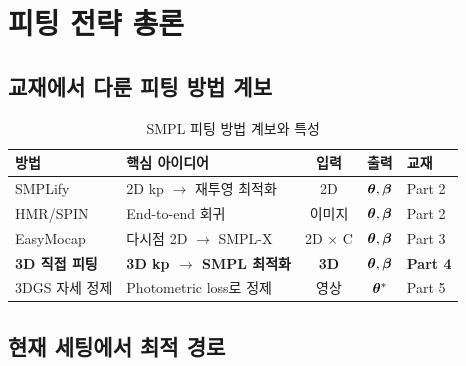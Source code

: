 \documentclass[11pt, a4paper]{report}
\begin{document}
\tableofcontents
\newpage


\chapter{피팅 전략 총론}

\section{교재에서 다룬 피팅 방법 계보}

\begin{table}[H]
\centering
\caption{SMPL 피팅 방법 계보와 특성}
\renewcommand{\arraystretch}{1.3}
\small
\begin{tabularx}{\textwidth}{lXccl}
\toprule
\textbf{방법} & \textbf{핵심 아이디어} & \textbf{입력} & \textbf{출력} & \textbf{교재} \\
\midrule
SMPLify & 2D kp $\rightarrow$ 재투영 최적화 & 2D & $\bm{\theta}, \bm{\beta}$ & Part 2 \\
HMR/SPIN & End-to-end 회귀 & 이미지 & $\bm{\theta}, \bm{\beta}$ & Part 2 \\
EasyMocap & 다시점 2D $\rightarrow$ SMPL-X & 2D $\times$ C & $\bm{\theta}, \bm{\beta}$ & Part 3 \\
\textbf{3D 직접 피팅} & \textbf{3D kp $\rightarrow$ SMPL 최적화} & \textbf{3D} & $\bm{\theta}, \bm{\beta}$ & \textbf{Part 4} \\
3DGS 자세 정제 & Photometric loss로 정제 & 영상 & $\bm{\theta}^*$ & Part 5 \\
\bottomrule
\end{tabularx}
\end{table}

\section{현재 세팅에서 최적 경로}
\end{document}

